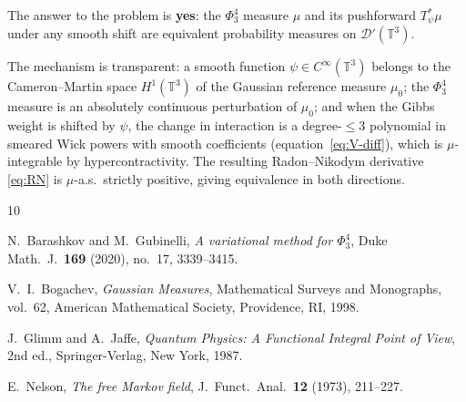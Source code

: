 \documentclass[11pt,a4paper]{article}
\theoremstyle{plain}
\theoremstyle{definition}
\newcommand{\T}{\mathbb{T}}
\newcommand{\cD}{\mathcal{D}}
\begin{document}
The answer to the problem is \textbf{yes}: the $\Phi^4_3$ measure $\mu$ and its
pushforward $T_\psi^*\mu$ under any smooth shift are equivalent probability measures
on $\cD'(\T^3)$.

The mechanism is transparent: a smooth function $\psi\in C^\infty(\T^3)$ belongs to
the Cameron--Martin space $H^1(\T^3)$ of the Gaussian reference measure $\mu_0$;
the $\Phi^4_3$ measure is an absolutely continuous perturbation of $\mu_0$; and when
the Gibbs weight is shifted by $\psi$, the change in interaction is a degree-$\le3$
polynomial in smeared Wick powers with smooth coefficients (equation~\eqref{eq:V-diff}),
which is $\mu$-integrable by hypercontractivity.  The resulting Radon--Nikodym
derivative \eqref{eq:RN} is $\mu$-a.s.\ strictly positive, giving equivalence in
both directions.

\begin{thebibliography}{10}

N.~Barashkov and M.~Gubinelli,
\emph{A variational method for $\Phi^4_3$},
Duke Math.\ J.\ \textbf{169} (2020), no.~17, 3339--3415.

V.~I.~Bogachev,
\emph{Gaussian Measures},
Mathematical Surveys and Monographs, vol.~62,
American Mathematical Society, Providence, RI, 1998.

J.~Glimm and A.~Jaffe,
\emph{Quantum Physics: A Functional Integral Point of View},
2nd ed., Springer-Verlag, New York, 1987.

E.~Nelson,
\emph{The free Markov field},
J.\ Funct.\ Anal.\ \textbf{12} (1973), 211--227.

\end{thebibliography}
\end{document}
